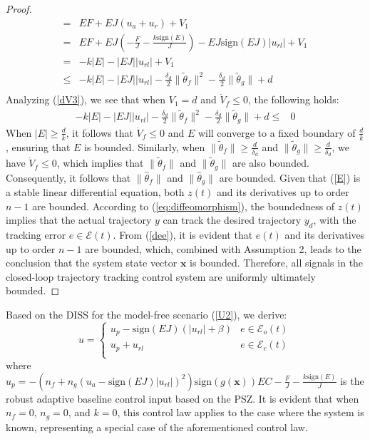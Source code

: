 \documentclass[preprint,12pt]{elsarticle}
\begin{document}
\begin{proof}
\begin{equation}
\begin{aligned}
                = & EF + EJ(u_a + u_r) + V_1\\
                = & EF + EJ(- \frac{F}{J} - \frac{k\mathrm{sign}(E)}{J}) - EJ\mathrm{sign}(EJ)|u_{rl}| + V_1 \\
                = & - k|E| - |EJ||u_{rl}| + V_1 \\
                \leq &  - k|E| - |EJ||u_{rl}| - \frac{\delta_d}{2}\|\tilde{\theta}_f\|^2 - \frac{\delta_d}{2}\|\tilde{\theta}_g\| + d \\
    \end{aligned}\label{dV3}
\end{equation}
Analyzing (\ref*{dV3}), we see that when \(V_1 = d\) and \( \dot{V}_f \leq 0\), the following holds:
\begin{equation}
    \begin{aligned}
        - k|E| - |EJ||u_{rl}| - \frac{\delta_d}{2}\|\tilde{\theta}_f\|^2 - \frac{\delta_d}{2}\|\tilde{\theta}_g\| + d \leq & 0
    \end{aligned}
\end{equation}
When \(|E| \geq \frac{d}{k}\), it follows that \( \dot{V}_f \leq 0\) and \(E\) will converge to a fixed boundary of \(\frac{d}{k}\), ensuring that \(E\) is bounded. Similarly, when \(\|\tilde{\theta}_f\| \geq \frac{d}{\delta_d}\) and \(\|\tilde{\theta}_g\| \geq \frac{d}{\delta_d}\), we have \( \dot{V}_f \leq 0\), which implies that \(\|\tilde{\theta}_f\|\) and \(\|\tilde{\theta}_g\|\) are also bounded. Consequently, it follows that \(\|\hat{\theta}_f\|\) and \(\|\hat{\theta}_g\|\) are bounded. Given that (\ref{E}) is a stable linear differential equation, both \(z(t)\) and its derivatives up to order 
\(n-1\) are bounded. According to (\ref{eq:diffeomorphism}), the boundedness of \(z(t)\) implies that the actual trajectory \(y\) can track the desired trajectory \(y_d\), with the tracking error \(e \in \mathcal{E}(t)\). From (\ref{dee}), it is evident that \(e(t)\) and its derivatives up to order 
\(n-1\) are bounded, which, combined with Assumption 2, leads to the conclusion that the system state vector \(\mathbf{x}\) is bounded. Therefore, all signals in the closed-loop trajectory tracking control system are uniformly ultimately bounded.
\end{proof}

Based on the DISS for the model-free scenario (\ref{U2}), we derive:
\begin{equation}
    u=
    \begin{cases} \label{umf}
        u_p - \mathrm{sign}(EJ)(|u_{rl}|+\beta) & e \in \mathcal{E}_o(t)\\
        u_p + u_{rl} & e \in \mathcal{E}_c(t)\\ 
    \end{cases} 
\end{equation}
where \(u_p = - (n_f+n_g(u_a-\mathrm{sign}(EJ)|u_{rl}|)^2)\mathrm{sign}(g(\mathbf{x})) EC- \frac{F}{J} - \frac{k\mathrm{sign}(E)}{J} \) is the robust adaptive baseline control input based on the PSZ. It is evident that when \(n_f = 0\), \(n_g = 0\), and \(k = 0\), this control law applies to the case where the system is known, representing a special case of the aforementioned control law.
\end{document}
